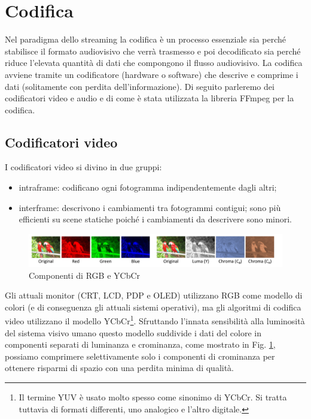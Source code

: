 \section{Codifica} \label{sec:cap3_Codifica}
Nel paradigma dello streaming la codifica è un processo essenziale sia perché stabilisce il formato audiovisivo che verrà trasmesso e poi decodificato sia perché riduce l'elevata quantità di dati che compongono il flusso audiovisivo. La codifica avviene tramite un codificatore (hardware o software) che descrive e comprime i dati (solitamente con perdita dell'informazione). Di seguito parleremo dei codificatori video e audio e di come è stata utilizzata la libreria FFmpeg per la codifica.

\subsection{Codificatori video}
I codificatori video si divino in due gruppi:

\begin{itemize}
	\item intraframe: codificano ogni fotogramma indipendentemente dagli altri;
	\item interframe: descrivono i cambiamenti tra fotogrammi contigui; sono più efficienti su scene statiche poiché i cambiamenti da descrivere sono minori.
\end{itemize}

\begin{figure}[H]
	\includegraphics[width=\linewidth]{immagini/RGB_YCbCr}
	\caption{Componenti di RGB e YCbCr}
	\label{fig:RGB_YCbCr}
\end{figure}

Gli attuali monitor (CRT, LCD, PDP e OLED) utilizzano RGB come modello di colori (e di conseguenza gli attuali sistemi operativi), ma gli algoritmi di codifica video utilizzano il modello YCbCr\footnote{Il termine YUV è usato molto spesso come sinonimo di YCbCr. Si tratta tuttavia di formati differenti, uno analogico e l'altro digitale.}. Sfruttando l'innata sensibilità alla luminosità del sistema visivo umano questo modello suddivide i dati del colore in componenti separati di luminanza e crominanza, come mostrato in Fig. \ref{fig:RGB_YCbCr}, possiamo comprimere selettivamente solo i componenti di crominanza per ottenere risparmi di spazio con una perdita minima di qualità.

